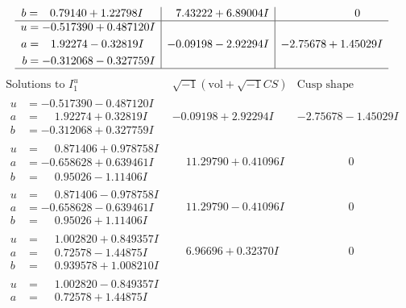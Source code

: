 \documentclass[1p]{elsarticle_modified}
\theoremstyle{definition}
\newcommand{\I}{\sqrt{-1}}
\begin{document}
$$\begin{array}{c|c|c}
\begin{aligned}
b &= \phantom{-}0.79140 + 1.22798 I\end{aligned}
 & \phantom{-}7.43222 + 6.89004 I & \phantom{-0.000000 } 0 \\ \hline\begin{aligned}
u &= -0.517390 + 0.487120 I \\
a &= \phantom{-}1.92274 - 0.32819 I \\
b &= -0.312068 - 0.327759 I\end{aligned}
 & -0.09198 - 2.92294 I & -2.75678 + 1.45029 I\\
 \hline 
 \end{array}$$\newpage$$\begin{array}{c|c|c}  
\text{Solutions to }I^u_{1}& \I (\text{vol} + \sqrt{-1}CS) & \text{Cusp shape}\\
 \hline 
\begin{aligned}
u &= -0.517390 - 0.487120 I \\
a &= \phantom{-}1.92274 + 0.32819 I \\
b &= -0.312068 + 0.327759 I\end{aligned}
 & -0.09198 + 2.92294 I & -2.75678 - 1.45029 I \\ \hline\begin{aligned}
u &= \phantom{-}0.871406 + 0.978758 I \\
a &= -0.658628 + 0.639461 I \\
b &= \phantom{-}0.95026 - 1.11406 I\end{aligned}
 & \phantom{-}11.29790 + 0.41096 I & \phantom{-0.000000 } 0 \\ \hline\begin{aligned}
u &= \phantom{-}0.871406 - 0.978758 I \\
a &= -0.658628 - 0.639461 I \\
b &= \phantom{-}0.95026 + 1.11406 I\end{aligned}
 & \phantom{-}11.29790 - 0.41096 I & \phantom{-0.000000 } 0 \\ \hline\begin{aligned}
u &= \phantom{-}1.002820 + 0.849357 I \\
a &= \phantom{-}0.72578 - 1.44875 I \\
b &= \phantom{-}0.939578 + 1.008210 I\end{aligned}
 & \phantom{-}6.96696 + 0.32370 I & \phantom{-0.000000 } 0 \\ \hline\begin{aligned}
u &= \phantom{-}1.002820 - 0.849357 I \\
a &= \phantom{-}0.72578 + 1.44875 I \\

\end{aligned}
\end{array}$$
\end{document}
